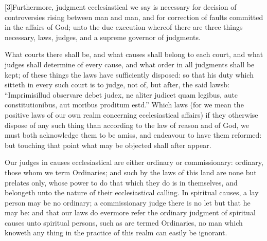 [3]Furthermore, judgment ecclesiastical we say is necessary for decision of controversies rising between man and man, and for correction of faults committed in the affairs of God; unto the due execution whereof there are three things necessary, laws, judges, and a supreme governor of judgments.


What courts there shall be, and what causes shall belong to each court, and what judges shall determine of every cause, and what order in all judgments shall be kept; of these things the laws have sufficiently disposed: so that his duty which sitteth in every such court is to judge, not of, but after, the said lawsb: “Imprimisillud observare debet judex, ne aliter judicet quam legibus, autc constitutionibus, aut moribus proditum estd.” Which laws (for we mean the positive laws of our own realm concerning ecclesiastical affairs) if they otherwise dispose of any such thing than according to the law of reason and of God, we must both acknowledge them to be amiss, and endeavour to have them reformed: but touching that point what may be objected shall after appear.

Our judges in causes ecclesiastical are either ordinary or commissionary: ordinary, those whom we term Ordinaries; and such by the laws of this land are none but prelates only, whose power to do that which they do is in themselves, and belongeth unto the nature of their ecclesiastical calling. In spiritual causes, a lay person may be no ordinary; a commissionary judge there is no let but that he may be: and that our laws do evermore refer the ordinary judgment of spiritual causes unto spiritual persons, such as are termed Ordinaries, no man which knoweth any thing in the practice of this realm can easily be ignorant.

